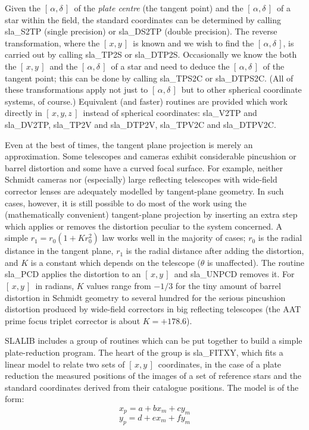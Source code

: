 \documentclass[11pt,twoside]{article}
\newcommand{\radec}     {$[\,\alpha,\delta\,]$}
\newcommand{\xy}        {$[\,x,y\,]$}
\newcommand{\xyz}       {$[\,x,y,z\,]$}
\begin{document}
Given the \radec\ of the {\it plate centre}\/ (the tangent point)
and the \radec\ of a star within the field, the standard
coordinates can be determined by calling
sla\_S2TP
(single precision) or
sla\_DS2TP
(double precision).  The reverse transformation, where the
\xy\ is known and we wish to find the \radec, is carried out by calling
sla\_TP2S
or
sla\_DTP2S.
Occasionally we know the both the \xy\ and the \radec\ of a
star and need to deduce the \radec\ of the tangent point;
this can be done by calling
sla\_TPS2C
or
sla\_DTPS2C.
(All of these transformations apply not just to \radec\ but to
other spherical coordinate systems, of course.)
Equivalent (and faster)
routines are provided which work directly in \xyz\ instead of
spherical coordinates:
sla\_V2TP and
sla\_DV2TP,
sla\_TP2V and
sla\_DTP2V,
sla\_TPV2C and
sla\_DTPV2C.

Even at the best of times, the tangent plane projection is merely an
approximation.  Some telescopes and cameras exhibit considerable pincushion
or barrel distortion and some have a curved focal surface.
For example, neither Schmidt cameras nor (especially)
large reflecting telescopes with wide-field corrector lenses
are adequately modelled by tangent-plane geometry.  In such
cases, however, it is still possible to do most of the work
using the (mathematically convenient) tangent-plane
projection by inserting an extra step which applies or
removes the distortion peculiar to the system concerned.
A simple $r_1=r_0(1+Kr_0^2)$ law works well in the
majority of cases; $r_0$ is the radial distance in the
tangent plane, $r_1$ is the radial distance after adding
the distortion, and $K$ is a constant which depends on the
telescope ($\theta$ is unaffected).  The routine
sla\_PCD
applies the distortion to an \xy\ and
sla\_UNPCD
removes it.  For \xy\ in radians, $K$ values range from $-1/3$ for the
tiny amount of barrel distortion in Schmidt geometry to several
hundred for the serious pincushion distortion
produced by wide-field correctors in big reflecting telescopes
(the AAT prime focus triplet corrector is about $K=+178.6$).

SLALIB includes a group of routines which can be put together
to build a simple plate-reduction program.  The heart of the group is
sla\_FITXY,
which fits a linear model to relate two sets of \xy\ coordinates,
in the case of a plate reduction the measured positions of the
images of a set of
reference stars and the standard
coordinates derived from their catalogue positions.  The
model is of the form:
\[x_{p} = a + bx_{m} + cy_{m}\]
\[y_{p} = d + ex_{m} + fy_{m}\]
\end{document}
